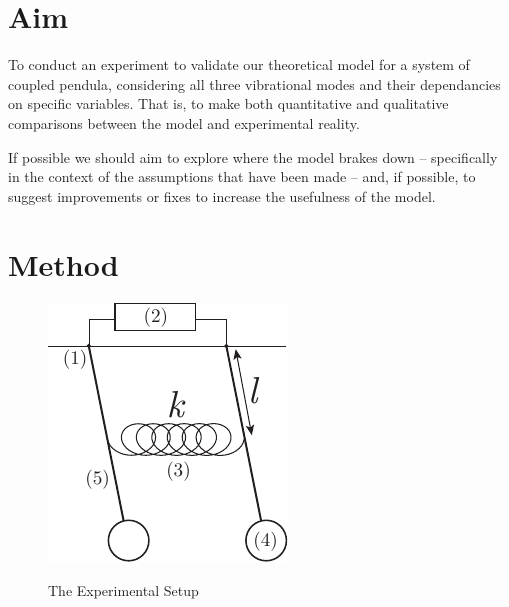\documentclass[aps,prl,reprint,10pt,amsmath,amssymb,superscriptaddress,a4paper, floatfix]{revtex4-2}
\begin{document}
\section{Aim}

To conduct an experiment to validate our theoretical model for a system of coupled pendula, considering all three vibrational modes and their dependancies on specific variables. That is, to make both quantitative and qualitative comparisons between the model and experimental reality.

If possible we should aim to explore where the model brakes down -- specifically in the context of the assumptions that have been made -- and, if possible, to suggest improvements or fixes to increase the usefulness of the model.




\section{Method}

\begin{figure}
\includegraphics[width = 8 cm]{Method Diagram.pdf}
\label{fig:setup}
\caption{The Experimental Setup}
\end{figure}
\end{document}

